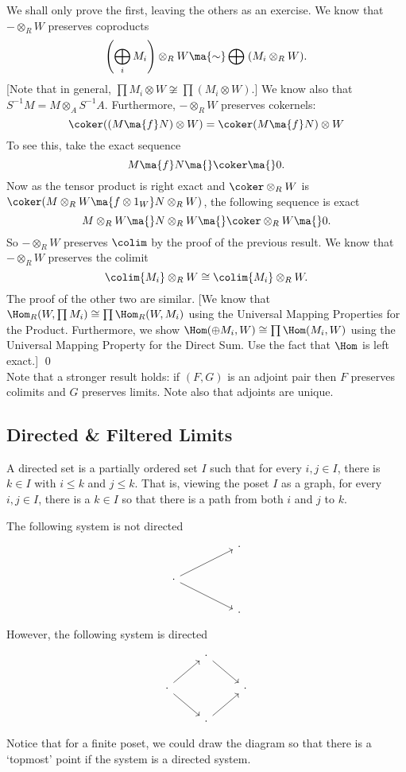 \pf We shall only prove the first, leaving the others as an exercise. We know that $- \otimes_R W$ preserves coproducts
	\[
	\left(\bigoplus_i M_i \right) \otimes_R W \ma{\sim} \bigoplus \;(M_i \otimes_R W).
	\]
[Note that in general, $\prod M_i \otimes W \not\cong \prod (M_i \otimes W)$.] We know also that $S^{-1}M=M \otimes_A S^{-1}A$. Furthermore, $-\otimes_R W$ preserves cokernels:
	\[
	\coker( (M \ma{f} N) \otimes W) = \coker (M \ma{f} N) \otimes W
	\]
To see this, take the exact sequence
	\[
	M \ma{f} N \ma{} \coker \ma{} 0.
	\]
Now as the tensor product is right exact and $\coker \otimes_R W$ is $\coker(M \otimes_R W \ma{f \otimes 1_W} N \otimes_R W)$, the following sequence is exact
	\[
	M \otimes_R W \ma{} N \otimes_R W \ma{} \coker \otimes_R W \ma{} 0.
	\]
So $-\otimes_R W$ preserves $\colim$ by the proof of the previous result. We know that $-\otimes_R W$ preserves the colimit
	\[
	\colim \{M_i\} \otimes_R W \cong \colim \{M_i\} \otimes_R W.
	\]
The proof of the other two are similar. [We know that $\Hom_R(W,\prod M_i) \cong \prod \Hom_R(W,M_i)$ using the Universal Mapping Properties for the Product. Furthermore, we show $\Hom(\oplus M_i,W) \cong \prod \Hom(M_i,W)$ using the Universal Mapping Property for the Direct Sum. Use the fact that $\Hom$ is left exact.] \qed \\


Note that a stronger result holds: if $(F,G)$ is an adjoint pair then $F$ preserves colimits and $G$ preserves limits. Note also that adjoints are unique. 



\subsection{Directed \& Filtered Limits}



\begin{dfn}
A directed set is a partially ordered set $I$ such that for every $i,j \in I$, there is $k \in I$ with $i \leq k$ and $j \leq k$. That is, viewing the poset $I$ as a graph, for every $i,j \in I$, there is a $k \in I$ so that there is a path from both $i$ and $j$ to $k$. 
\end{dfn}


\begin{ex}
The following system is not directed
	\[
	\begin{tikzcd}
	& & \cdot \\
	\cdot \arrow{urr} \arrow{drr} & & \\
	& & \cdot 
	\end{tikzcd}
	\]
However, the following system is directed
	\[
	\begin{tikzcd}
	& \cdot \arrow{dr} &  \\
	\cdot \arrow{ur} \arrow{dr} & & \cdot \\
	& \cdot \arrow{ur} &  
	\end{tikzcd}
	\]
Notice that for a finite poset, we could draw the diagram so that there is a `topmost' point if the system is a directed system. \xqed
\end{ex}


